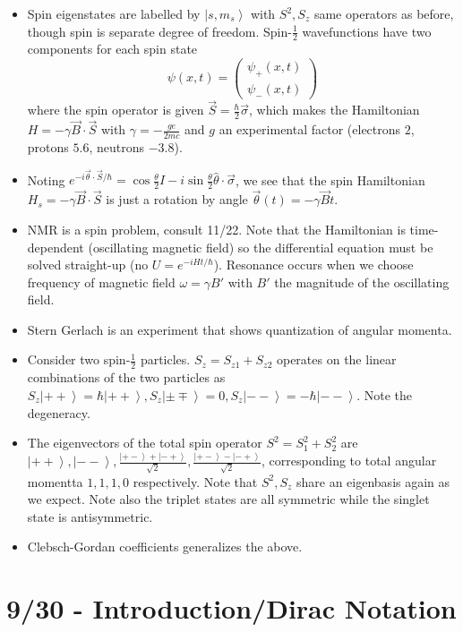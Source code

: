 \documentclass[10pt]{report}
\newcommand{\ket}[1]{\left|#1\right>}
\begin{document}
\begin{itemize}
    \item Spin eigenstates are labelled by $\ket{s, m_s}$ with $S^2, S_z$ same operators as before, though spin is separate degree of freedom. Spin-$\frac{1}{2}$ wavefunctions have two components for each spin state
        $$\psi(x,t) = \begin{pmatrix}\psi_+(x,t)\\ \psi_-(x,t)\end{pmatrix}$$
        where the spin operator is given $\vec{S} = \frac{\hbar}{2}\vec{\sigma}$, which makes the Hamiltonian $H = -\gamma \vec{B}\cdot \vec{S}$ with $\gamma = -\frac{ge}{2mc}$ and $g$ an experimental factor (electrons $2$, protons $5.6$, neutrons $-3.8$).
    \item Noting $e^{-i\vec{\theta} \cdot \vec{S} / \hbar} = \cos \frac{\theta}{2}I - i\sin\frac{\theta}{2}\hat{\theta}\cdot \vec{\sigma}$, we see that the spin Hamiltonian $H_s = -\gamma\vec{B}\cdot \vec{S}$ is just a rotation by angle $\vec{\theta}(t) = -\gamma\vec{B}t$.
    \item NMR is a spin problem, consult 11/22. Note that the Hamiltonian is time-dependent (oscillating magnetic field) so the differential equation must be solved straight-up (no $U = e^{-iHt/\hbar}$). Resonance occurs when we choose frequency of magnetic field $\omega = \gamma B'$ with $B'$ the magnitude of the oscillating field.
    \item Stern Gerlach is an experiment that shows quantization of angular momenta. 
    \item Consider two spin-$\frac{1}{2}$ particles. $S_z = S_{z1} + S_{z2}$ operates on the linear combinations of the two particles as $S_z \ket{++} = \hbar\ket{++}, S_z \ket{\pm \mp} = 0, S_z \ket{- -} = -\hbar\ket{--}$. Note the degeneracy.
    \item The eigenvectors of the total spin operator $S^2 = S_1^2 + S_2^2$ are $\ket{++}, \ket{--}, \frac{\ket{+ -} + \ket{- +}}{\sqrt{2}}, \frac{\ket{+ -} - \ket{- +}}{\sqrt{2}}$, corresponding to total angular momentta $1,1,1,0$ respectively. Note that $S^2, S_z$ share an eigenbasis again as we expect.  Note also the triplet states are all symmetric while the singlet state is antisymmetric.
    \item Clebsch-Gordan coefficients generalizes the above.
\end{itemize}

\chapter{9/30 - Introduction/Dirac Notation}
\end{document}
